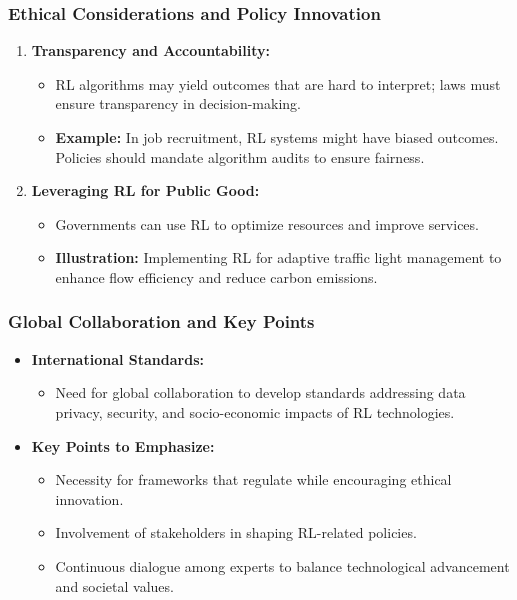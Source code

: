 \documentclass[aspectratio=169]{beamer}
\begin{document}
\begin{frame}[fragile]
    \frametitle{Ethical Considerations and Policy Innovation}
    \begin{enumerate}
        \item \textbf{Transparency and Accountability:}
        \begin{itemize}
            \item RL algorithms may yield outcomes that are hard to interpret; laws must ensure transparency in decision-making.
            \item \textbf{Example:} In job recruitment, RL systems might have biased outcomes. Policies should mandate algorithm audits to ensure fairness.
        \end{itemize}
        
        \item \textbf{Leveraging RL for Public Good:}
        \begin{itemize}
            \item Governments can use RL to optimize resources and improve services.
            \item \textbf{Illustration:} Implementing RL for adaptive traffic light management to enhance flow efficiency and reduce carbon emissions.
        \end{itemize}
    \end{enumerate}
\end{frame}

\begin{frame}[fragile]
    \frametitle{Global Collaboration and Key Points}
    \begin{itemize}
        \item \textbf{International Standards:}
        \begin{itemize}
            \item Need for global collaboration to develop standards addressing data privacy, security, and socio-economic impacts of RL technologies.
        \end{itemize}
        \item \textbf{Key Points to Emphasize:}
        \begin{itemize}
            \item Necessity for frameworks that regulate while encouraging ethical innovation.
            \item Involvement of stakeholders in shaping RL-related policies.
            \item Continuous dialogue among experts to balance technological advancement and societal values.
        \end{itemize}
    \end{itemize}
\end{frame}
\end{document}
